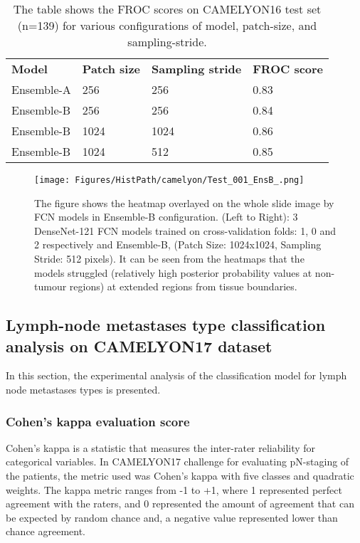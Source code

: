 \documentclass[times,twocolumn,final,authoryear]{tmp}
\begin{document}
\begin{table}
\centering
\caption{The table shows the FROC scores on CAMELYON16 test set (n=139) for various configurations of model, patch-size, and sampling-stride.}
\label{path_tab:froc-hyperparam}
\begin{tabular}{@{}llll@{}}

  
\textbf{Model} & \textbf{Patch size} & \textbf{Sampling stride} & \textbf{FROC score} \\    
Ensemble-A     & 256                 & 256                      & 0.83                \\
Ensemble-B     & 256                 & 256                      & 0.84                \\
Ensemble-B     & 1024                & 1024                     & 0.86                \\
Ensemble-B     & 1024                & 512                      & 0.85                \\  
\end{tabular}\end{table}

\begin{figure}
    \texttt{[image: Figures/HistPath/camelyon/Test\_001\_EnsB\_.png]}
    \caption{The figure shows the heatmap overlayed on the whole slide image by FCN models in Ensemble-B configuration. (Left to Right): 3 DenseNet-121 FCN models trained on cross-validation folds: 1, 0 and 2 respectively and Ensemble-B, (Patch Size: 1024x1024, Sampling Stride: 512 pixels). It can be seen from the heatmaps that the models struggled (relatively high posterior probability values at non-tumour regions) at extended regions from tissue boundaries.}
    \label{path_fig:EnsB}
\end{figure} 


\subsection{Lymph-node metastases type classification analysis on CAMELYON17 dataset}
In this section, the experimental analysis of the classification model for lymph node metastases types is presented. 


\subsubsection{Cohen's kappa evaluation score}
Cohen's kappa \citep{fleiss1973equivalence} is a statistic that measures the inter-rater reliability for categorical variables. In CAMELYON17 challenge for evaluating pN-staging of the patients, the metric used was Cohen's kappa with five classes and quadratic weights. The kappa metric ranges from -1 to +1, where 1 represented perfect agreement with the raters, and 0 represented the amount of agreement that can be expected by random chance and, a negative value represented lower than chance agreement. 
\end{document}
